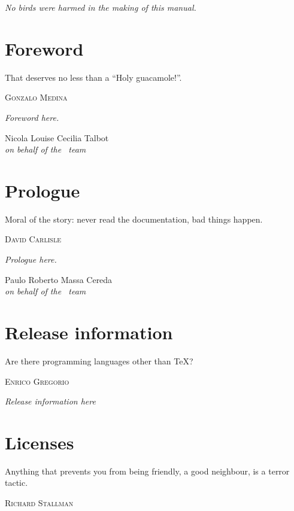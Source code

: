\documentclass[a4paper,twoside,12pt]{memoir}
\begin{document}
\vspace*{25em}

\begin{flushright}
\em No birds were harmed in the making of this manual.
\end{flushright}

\chapter*{Foreword}
\label{chap:foreword}

\epigraph{That deserves no less than a ``Holy guacamole!''.}{\textsc{Gonzalo Medina}}

\emph{Foreword here.}

\vfill

\begin{flushright}
Nicola Louise Cecilia Talbot\\
\emph{on behalf of the \arara\ team}
\end{flushright}

\chapter*{Prologue}
\label{chap:prologue}

\epigraph{Moral of the story: never read the documentation, bad things happen.}{\textsc{David Carlisle}}

\emph{Prologue here.}

\vfill

\begin{flushright}
Paulo Roberto Massa Cereda\\
\emph{on behalf of the \arara\ team}
\end{flushright}

\chapter*{Release information}
\label{chap:releaseinformation}

\epigraph{Are there programming languages other than \TeX?}{\textsc{Enrico Gregorio}}

\emph{Release information here}

\chapter*{Licenses}
\label{chap:license}

\epigraph{Anything that prevents you from being friendly, a good neighbour, is a terror tactic.}{\textsc{Richard Stallman}}
\end{document}
